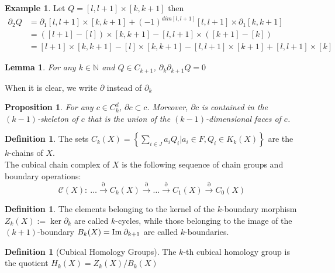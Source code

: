 \documentclass{article}
\newcommand{\N}{\mathbb{N}}
\newcommand{\img}{\textmd{Im}\:}
\theoremstyle{plain}
\newtheorem{lemma}[thm]{Lemma}
\newtheorem{prop}[thm]{Proposition}
\theoremstyle{definition}
\newtheorem{definition}[thm]{Definition}
\newtheorem{example}[thm]{Example}
\theoremstyle{remark}
\begin{document}
\begin{example}
Let $Q=[l,l+1] \times [k,k+1]$ then 
\begin{align*}
    \partial_2 Q &= \partial_1 [l,l+1] \times [k,k+1] + (-1)^{dim [l,l+1]} [l,l+1] \times \partial_1 [k,k+1] \\ 
    &= ([l+1] - [l]) \times [k,k+1] - [l,l+1] \times ([k+1] - [k]) \\
    &= [l+1] \times [k,k+1] - [l] \times [k,k+1] - [l,l+1] \times [k+1] + [l,l+1] \times [k]
\end{align*}
\end{example}

\begin{lemma}
For any $k\in \N$ and $Q \in C_{k+1}$, $\partial_k \partial_{k+1} Q = 0$
\end{lemma}

When it is clear, we write $\partial$ instead of $\partial_k$

\begin{prop}
For any $c\in C^d_k$, $\partial c \subset c$. Moreover, $\partial c$ is contained in the $(k-1)$-skeleton of $c$ that is the union of the $(k-1)$-dimensional faces of $c$.
\end{prop}

\begin{definition}
The sets $C_k(X) = \left\{ \sum_{i\in J} a_i Q_i | a_i \in F, Q_i \in K_k(X) \right\}$ are the $k$-chains of $X$. \\
The cubical chain complex of $X$ is the following sequence of chain groups and boundary operations:
\[ \mathcal{C}(X): \ \dots \stackrel{\partial}{\longrightarrow} C_k(X) \stackrel{\partial}{\longrightarrow} \dots \stackrel{\partial}{\longrightarrow} C_1(X) \stackrel{\partial}{\longrightarrow} C_0(X) \]
\end{definition}

\begin{definition}
The elements belonging to the kernel of the $k$-boundary morphism $Z_k(X) := \ker\partial_k$ are called $k$-cycles, while those belonging to the image of the $(k+1)$-boundary $B_k(X) = \img \partial_{k+1}$ are called $k$-boundaries.
\end{definition}

\begin{definition}[Cubical Homology Groups]
The $k$-th cubical homology group is the quotient $ H_k(X)=Z_k(X)/B_k(X) $
\end{definition}
\end{document}
